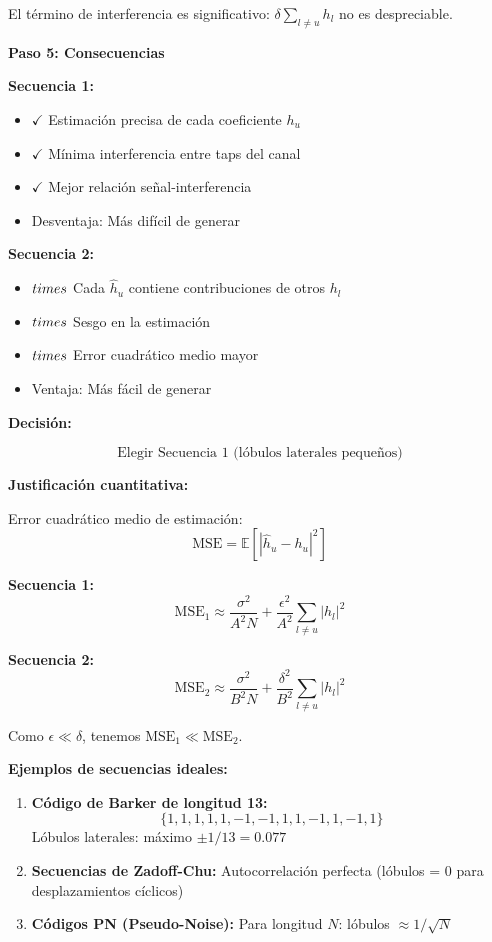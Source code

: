 \documentclass[11pt,a4paper]{article}
\begin{document}
El t\'ermino de interferencia es significativo: $\delta \sum_{l \neq u} h_l$ no es despreciable.

\textbf{Paso 5: Consecuencias}

\textbf{Secuencia 1:}
\begin{itemize}
    \item $\checkmark$ Estimaci\'on precisa de cada coeficiente $h_u$
    \item $\checkmark$ M\'inima interferencia entre taps del canal
    \item $\checkmark$ Mejor relaci\'on se\~nal-interferencia
    \item Desventaja: M\'as dif\'icil de generar
\end{itemize}

\textbf{Secuencia 2:}
\begin{itemize}
    \item $\\times$ Cada $\hat{h}_u$ contiene contribuciones de otros $h_l$
    \item $\\times$ Sesgo en la estimaci\'on
    \item $\\times$ Error cuadr\'atico medio mayor
    \item Ventaja: M\'as f\'acil de generar
\end{itemize}

\textbf{Decisi\'on:}

\[
\boxed{\text{Elegir Secuencia 1 (l\'obulos laterales peque\~nos)}}
\]

\textbf{Justificaci\'on cuantitativa:}

Error cuadr\'atico medio de estimaci\'on:
\[
\text{MSE} = \mathbb{E}[|\hat{h}_u - h_u|^2]
\]

\textbf{Secuencia 1:}
\[
\text{MSE}_1 \approx \frac{\sigma^2}{A^2 N} + \frac{\epsilon^2}{A^2} \sum_{l \neq u} |h_l|^2
\]

\textbf{Secuencia 2:}
\[
\text{MSE}_2 \approx \frac{\sigma^2}{B^2 N} + \frac{\delta^2}{B^2} \sum_{l \neq u} |h_l|^2
\]

Como $\epsilon \ll \delta$, tenemos $\text{MSE}_1 \ll \text{MSE}_2$.

\textbf{Ejemplos de secuencias ideales:}

\begin{enumerate}
    \item \textbf{C\'odigo de Barker de longitud 13:}
    \[
    \{1,1,1,1,1,-1,-1,1,1,-1,1,-1,1\}
    \]
    L\'obulos laterales: m\'aximo $\pm 1/13 = 0.077$
    
    \item \textbf{Secuencias de Zadoff-Chu:}
    Autocorrelaci\'on perfecta (l\'obulos = 0 para desplazamientos c\'iclicos)
    
    \item \textbf{C\'odigos PN (Pseudo-Noise):}
    Para longitud $N$: l\'obulos $\approx 1/\sqrt{N}$
\end{enumerate}
\end{document}
